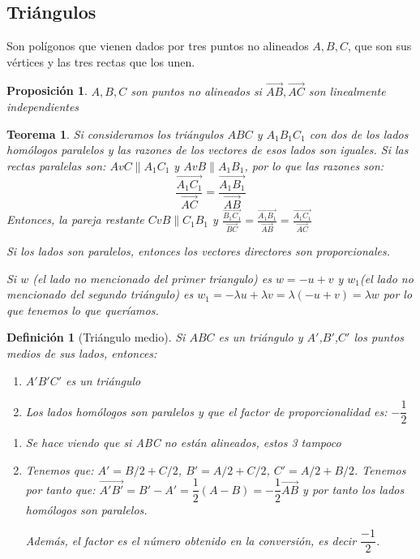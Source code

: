 \documentclass[11pt, a4paper, titlepage]{article}
\makeatletter
\renewenvironment{proof}[1][\proofname] {\vspace{-15pt}\par\pushQED{\qed}\normalfont\topsep6\p@\@plus6\p@\relax\trivlist\item[\hskip\labelsep\it#1\@addpunct{.}]\ignorespaces}{\popQED\endtrivlist\@endpefalse}
\theoremstyle{theorem-style}
\newtheorem*{nth}{Teorema}
\newtheorem*{nprop}{Proposición}
\theoremstyle{definition-style}
\newtheorem*{ndef}{Definición}
\theoremstyle{remark-style}
\theoremstyle{example-style}
\newenvironment{nlist}
{\begin{enumerate}
\renewcommand\labelenumi{(\emph{\roman{enumi})}}}
{\end{enumerate}}
\makeatother
\begin{document}
\subsection{Triángulos}
Son polígonos que vienen dados por tres puntos no alineados $A,B,C$, que son sus vértices y las tres rectas que los unen.

\begin{nprop}
$A,B,C$ son puntos no alineados si $\vec{AB},\vec{AC}$ son linealmente independientes
\end{nprop}


\begin{nth}
	Si consideramos los triángulos $ABC$ y $A_1B_1C_1$ con dos de los lados homólogos paralelos y las razones de los vectores de esos lados son iguales. 
	Si las rectas paralelas son: $AvC \parallel A_1C_1$ y $AvB \parallel A_1B_1$, por lo que las razones son:
	\[
	\frac{\vec{A_1C_1}}{\vec{AC}} = \frac{\vec{A_1B_1}}{\vec{AB}}
	\]
	Entonces, la pareja restante $CvB \parallel C_1B_1$ y $\frac{\vec{B_1C_1}}{\vec{BC}} = \frac{\vec{A_1B_1}}{\vec{AB}} = \frac{\vec{A_1C_1}}{\vec{AC}}$\\
	\begin{proof}
	Si los lados son paralelos, entonces los vectores directores son proporcionales.
	
	Si $w$ (el lado no mencionado del primer triangulo) es $w=-u+v$ y $w_1$(el lado no mencionado del segundo triángulo) es $w_1 = - \lambda u + \lambda v = \lambda (-u+v) = \lambda w$  por lo que tenemos lo que queríamos.
\end{proof}
\end{nth}
 
\begin{ndef}[Triángulo medio]
	Si $ABC$ es un triángulo y $A'$,$B'$,$C'$ los puntos medios de sus lados, entonces:
	\begin{nlist}
	\item $A'B'C'$ es un triángulo
	\item Los lados homólogos son paralelos y que el factor de proporcionalidad es: $-\dfrac{1}{2}$
\end{nlist}\vspace{0.2cm}
\begin{proof}

	\begin{nlist}
	\item Se hace viendo que si ABC no están alineados, estos 3 tampoco
	\item Tenemos que: $A' = B/2 + C/2$, $B' = A/2+C/2$, $C' = A/2 + B/2$. Tenemos por tanto que: $\vec{A'B'} = B'-A' = \dfrac{1}{2}(A-B) = -\dfrac{1}{2} \vec{AB}$ y por tanto los lados homólogos son paralelos.

Además, el factor es el número obtenido en la conversión, es decir $\dfrac{-1}{2}$.
\end{nlist}
\end{proof}
\end{ndef}
\end{document}
